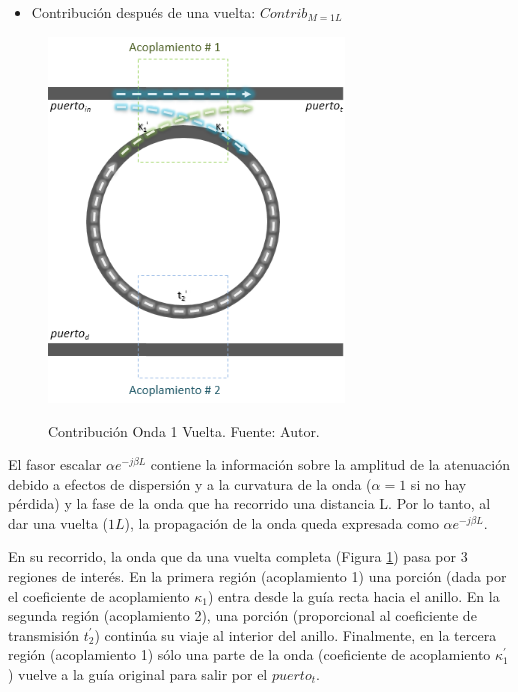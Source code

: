 \begin{itemize}
\item Contribución después de una vuelta: $Contrib_{M=1L}$
\end{itemize} 


\begin{figure}[h!]
\caption{Contribución Onda 1 Vuelta. Fuente: Autor.}
\centering
\includegraphics[width=0.7\textwidth,natwidth=397,natheight=490]{figs/rr_n1.PNG}
\label{fig:rr_n1}
\end{figure} 

El fasor escalar $\alpha e^{-j \beta L}$ contiene la información sobre la amplitud de
la atenuación debido a efectos de dispersión y a la curvatura de la onda 
($\alpha=1$ si no hay pérdida)
y la fase de la onda que ha recorrido una distancia L. 
Por lo tanto, al dar una vuelta ($1L$), la propagación de la onda queda expresada como 
$\alpha e^{-j \beta L}$.

En su recorrido, la onda que da una vuelta completa (Figura \ref{fig:rr_n1}) 
pasa por 3 regiones de interés. 
En la primera región (acoplamiento 1) una porción (dada por el coeficiente de acoplamiento 
$\kappa_1$) entra desde la guía recta hacia el anillo.
En la segunda región (acoplamiento 2), una porción (proporcional al coeficiente de transmisión 
$t_2^{'}$) continúa su viaje al interior del anillo.
Finalmente, en la tercera región (acoplamiento 1) sólo una parte de la onda 
(coeficiente de acoplamiento $\kappa_1^{'}$) vuelve a la guía original para 
salir por el $puerto_t$. 


